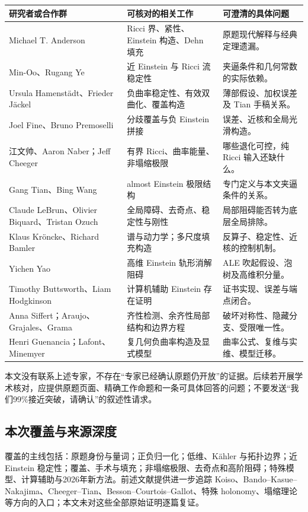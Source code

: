 \documentclass[11pt,a4paper]{article}
\theoremstyle{definition}
\begin{document}
\begin{longtable}{P{0.30\textwidth}P{0.34\textwidth}P{0.27\textwidth}}
\toprule
研究者或合作群 & 可核对的相关工作 & 可澄清的具体问题\\\midrule\endhead
Michael T. Anderson & Ricci 界、紧性、Einstein 构造、Dehn 填充 & 原题现代解释与经典定理遗漏。\\
Min-Oo、Rugang Ye & 近 Einstein 与 Ricci 流稳定性 & 夹逼条件和几何常数的实际依赖。\\
Ursula Hamenstädt、Frieder Jäckel & 负曲率稳定性、有效双曲化、覆盖构造 & 薄部假设、加权误差及 Tian 手稿关系。\\
Joel Fine、Bruno Premoselli & 分歧覆盖与负 Einstein 拼接 & 误差、近核和全局光滑构造。\\
江文帅、Aaron Naber；Jeff Cheeger & 有界 Ricci、曲率能量、非塌缩极限 & 哪些退化可控，纯 Ricci 输入还缺什么。\\
Gang Tian、Bing Wang & almost Einstein 极限结构 & 专门定义与本文夹逼条件的关系。\\
Claude LeBrun、Olivier Biquard、Tristan Ozuch & 全局障碍、去奇点、稳定性与刚性 & 局部阻碍能否转为底层全局排除。\\
Klaus Kröncke、Richard Bamler & 谱与动力学；多尺度填充构造 & 反算子、稳定性、近核的控制机制。\\
Yichen Yao & 高维 Einstein 轨形消解阻碍 & ALE 吹起假设、泡树及高维积分量。\\
Timothy Buttsworth、Liam Hodgkinson & 计算机辅助 Einstein 存在证明 & 证书实现、误差与端点闭合。\\
Anna Siffert；Araujo、Grajales、Grama & 齐性检测、余齐性局部结构和边界方程 & 破坏对称性、隐藏分支、受限唯一性。\\
Henri Guenancia；Lafont、Minemyer & 复几何负曲率构造及显式模型 & 曲率公式、复维与实维、模型迁移。\\\bottomrule
\end{longtable}

本文没有联系上述专家，不存在“专家已经确认原题仍开放”的证据。后续若开展学术核对，应提供原题页面、精确工作命题和一条可具体回答的问题；不要发送“我们99\%接近突破，请确认”的叙述性请求。

\subsection{本次覆盖与来源深度}

覆盖的主线包括：原题身份与量词；正负归一化；低维、Kähler 与拓扑边界；近 Einstein 稳定性；覆盖、手术与填充；非塌缩极限、去奇点和高阶阻碍；特殊模型、计算辅助与2026年新方法。前述文献提供进一步追踪 Koiso、Bando--Kasue--Nakajima、Cheeger--Tian、Besson--Courtois--Gallot、特殊 holonomy、塌缩理论等方向的入口；本文未对这些全部原始证明逐篇复证。
\end{document}
